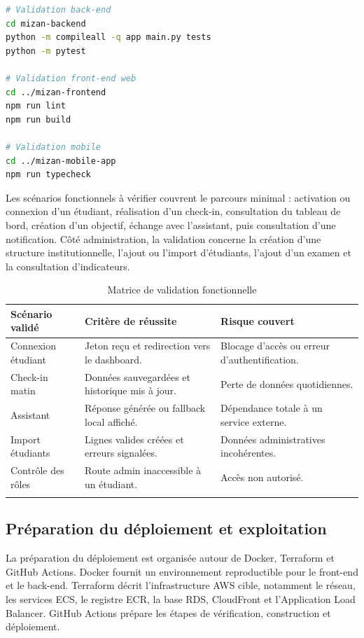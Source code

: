 \documentclass{rapportENSET}
\begin{document}
\begin{lstlisting}[language=bash]
# Validation back-end
cd mizan-backend
python -m compileall -q app main.py tests
python -m pytest

# Validation front-end web
cd ../mizan-frontend
npm run lint
npm run build

# Validation mobile
cd ../mizan-mobile-app
npm run typecheck
\end{lstlisting}

Les scénarios fonctionnels à vérifier couvrent le parcours minimal : activation ou connexion d'un étudiant, réalisation d'un check-in, consultation du tableau de bord, création d'un objectif, échange avec l'assistant, puis consultation d'une notification. Côté administration, la validation concerne la création d'une structure institutionnelle, l'ajout ou l'import d'étudiants, l'ajout d'un examen et la consultation d'indicateurs.

\begin{longtable}{@{}L{0.28\textwidth}L{0.34\textwidth}L{0.28\textwidth}@{}}
\toprule
\textbf{Scénario validé} & \textbf{Critère de réussite} & \textbf{Risque couvert} \\
\midrule
\endhead
Connexion étudiant & Jeton reçu et redirection vers le dashboard. & Blocage d'accès ou erreur d'authentification. \\
Check-in matin & Données sauvegardées et historique mis à jour. & Perte de données quotidiennes. \\
Assistant & Réponse générée ou fallback local affiché. & Dépendance totale à un service externe. \\
Import étudiants & Lignes valides créées et erreurs signalées. & Données administratives incohérentes. \\
Contrôle des rôles & Route admin inaccessible à un étudiant. & Accès non autorisé. \\
\bottomrule
\caption{Matrice de validation fonctionnelle}
\end{longtable}

\subsection{Préparation du déploiement et exploitation}
La préparation du déploiement est organisée autour de Docker, Terraform et GitHub Actions. Docker fournit un environnement reproductible pour le front-end et le back-end. Terraform décrit l'infrastructure AWS cible, notamment le réseau, les services ECS, le registre ECR, la base RDS, CloudFront et l'Application Load Balancer. GitHub Actions prépare les étapes de vérification, construction et déploiement.
\end{document}
